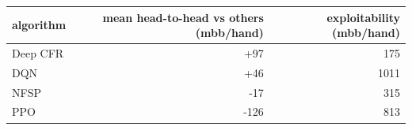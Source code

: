 \begin{tabular}{lrr}
\toprule
algorithm & mean head-to-head vs others (mbb/hand) & exploitability (mbb/hand) \\
\midrule
Deep CFR & +97 & 175 \\
DQN & +46 & 1011 \\
NFSP & -17 & 315 \\
PPO & -126 & 813 \\
\bottomrule
\end{tabular}
